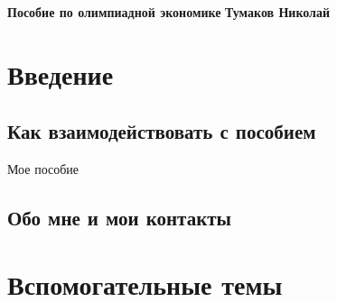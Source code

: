 



\thispagestyle{plain}
\begin{titlepage}
    \hfill\begin{center}
        \begin{tcolorbox}[collower=\mycolor{\mycolorlower},colupper=\mycolor{\mycolorupper},colframe=\mycolor{\mycolorframe},colback=\mycolor{\mycolorback},fonttitle=\Large\bfseries\centering,title=Модель Хотеллинга. Сигналинг. Вертикальное дифференциация товара]
        \large\centering\textbf{Пособие по олимпиадной экономике}
        \tcblower
        \centering\textbf{Тумаков Николай}
        \end{tcolorbox}
    \end{center}
\end{titlepage}

\restoregeometry

\tableofcontents

\chapter{Введение}
\section{Как взаимодействовать с пособием}
\indent\setlength{\parindent}{1em}Мое пособие

\section{Обо мне и мои контакты}

\chapter{Вспомогательные темы}
